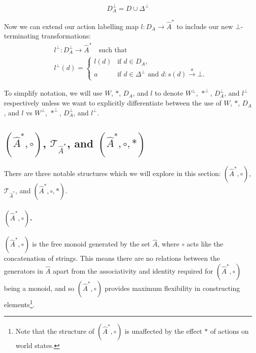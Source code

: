 \begin{equation}
	D_{A}^{\bot} = D \cup \Delta^{\bot}
\end{equation}

Now we can extend our action labelling map $l: D_{A} \to \hat{A}^{\ast}$ to include our new $\bot$-terminating transformations:
\begin{align}
	 & l^{\bot} : D_{A}^{\bot} \to \hat{A}^{\ast} \quad\text{such that} \\
	 & l^{\bot}(d) =
	\begin{cases}
		l(d) & \text{if $d \in D_{A}$},                                            \\
		a    & \text{if $d \in \Delta^{\bot}$ and $d: s(d) \xrightarrow{a} \bot$.}
	\end{cases}
\end{align}

To simplify notation, we will use $W$, $\ast$, $D_{A}$, and $l$ to denote $W^{\bot}$, $\ast^{\bot}$, $D_{A}^{\bot}$, and $l^{\bot}$ respectively unless we want to explicitly differentiate between the use of $W$, $\ast$, $D_{A}$, and $l$ vs $W^{\bot}$, $\ast^{\bot}$, $D_{A}^{\bot}$, and $l^{\bot}$.


\subsection{$(\hat{A}^{\ast}, \circ)$, $\mathcal{T}_{\hat{A}^{\ast}}$, and $(\hat{A}^{\ast}, \circ, \ast)$}

There are three notable structures which we will explore in this section: $(\hat{A}^{\ast}, \circ)$, $\mathcal{T}_{\hat{A}^{\ast}}$, and $(\hat{A}^{\ast}, \circ, \ast)$.

\paragraph{$(\hat{A}^{\ast}, \circ)$.}
$(\hat{A}^{\ast}, \circ)$ is the free monoid generated by the set $\hat{A}$, where $\circ$ acts like the concatenation of strings.
This means there are no relations between the generators in $\hat{A}$ apart from the associativity and identity required for $(\hat{A}^{\ast}, \circ)$ being a monoid, and so $(\hat{A}^{\ast}, \circ)$ provides maximum flexibility in constructing elements\footnote{Note that the structure of $(\hat{A}^{\ast}, \circ)$ is unaffected by the effect $\ast$ of actions on world states.}.

